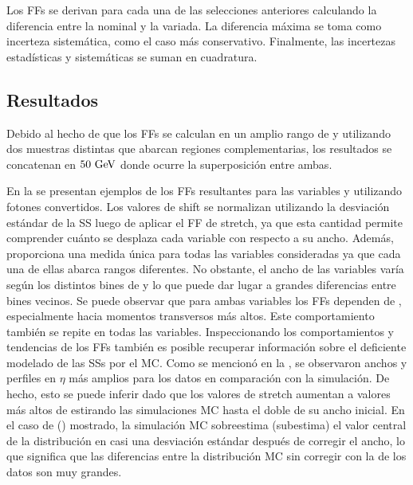 Los \acp{FF} se derivan para cada una de las selecciones anteriores calculando la diferencia entre la nominal y la variada. La diferencia máxima se toma como incerteza sistemática, como el caso más conservativo. Finalmente, las incertezas estadísticas y sistemáticas se suman en cuadratura.










\subsection{Resultados}
\label{subsec:ss_corrections:ffs:results}


Debido al hecho de que los \acp{FF} se calculan en un amplio rango de \pt y utilizando dos muestras distintas que abarcan regiones complementarias, los resultados se concatenan en \(50~\text{GeV}\) donde ocurre la superposición entre ambas.


En la \Fig{\ref{fig:ss_corrections:ffs:reslts:ffs}} se presentan ejemplos de los \acp{FF} resultantes para las variables \reta y \weta utilizando fotones convertidos.
Los valores de shift se normalizan utilizando la desviación estándar de la \ac{SS} luego de aplicar el \ac{FF} de stretch, ya que esta cantidad permite comprender cuánto se desplaza cada variable con respecto a su ancho. Además, proporciona una medida única para todas las variables consideradas ya que cada una de ellas abarca rangos diferentes. No obstante, el ancho de las variables varía según los distintos bines de \pt y \abseta lo que puede dar lugar a grandes diferencias entre bines vecinos.
Se puede observar que para ambas variables los \acp{FF} dependen de \pt, especialmente hacia momentos transversos más altos. Este comportamiento también se repite en todas las variables.
Inspeccionando los comportamientos y tendencias de los \acp{FF} también es posible recuperar información sobre el deficiente modelado de las \acp{SS} por el \ac{MC}. Como se mencionó en la \Sect{\ref{sec:pid_ss:ss_differences}}, se observaron anchos y perfiles en \(\eta\) más amplios para los datos en comparación con la simulación. De hecho, esto se puede inferir dado que los valores de stretch aumentan a valores más altos de \pt estirando las simulaciones \ac{MC} hasta el doble de su ancho inicial. En el caso de \reta (\weta) mostrado, la simulación \ac{MC} sobreestima (subestima) el valor central de la distribución en casi una desviación estándar después de corregir el ancho, lo que significa que las diferencias entre la distribución \ac{MC} sin corregir con la de los datos son muy grandes.

